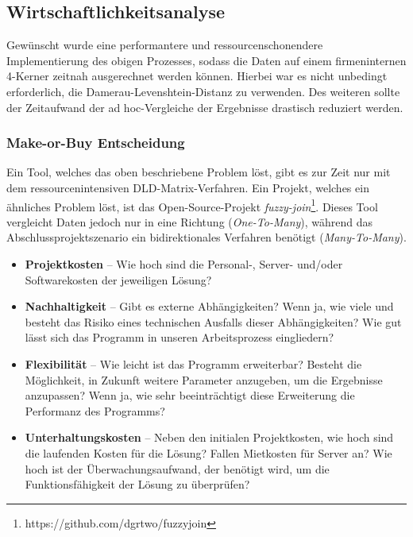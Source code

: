 \subsection{Wirtschaftlichkeitsanalyse}
Gewünscht wurde eine performantere und ressourcenschonendere Implementierung des obigen Prozesses,
sodass die Daten auf einem firmeninternen 4-Kerner zeitnah ausgerechnet werden können.
Hierbei war es nicht unbedingt erforderlich, die Damerau-Levenshtein-Distanz zu verwenden.
Des weiteren sollte der Zeitaufwand der ad hoc-Vergleiche der Ergebnisse drastisch reduziert werden.\par

\subsubsection{Make-or-Buy Entscheidung}
Ein Tool, welches das oben beschriebene Problem löst, gibt es zur Zeit nur mit dem
ressourcenintensiven DLD-Matrix-Verfahren. Ein Projekt, welches ein ähnliches
Problem löst, ist das Open-Source-Projekt \textit{fuzzy-join}\footnote{https://github.com/dgrtwo/fuzzyjoin}.
Dieses Tool vergleicht Daten jedoch nur in eine Richtung (\textit{One-To-Many}),
während das Abschlussprojektszenario ein bidirektionales Verfahren benötigt (\textit{Many-To-Many}).\par


\begin{itemize}
    \item \textbf{Projektkosten} -- Wie hoch sind die Personal-, Server- und/oder Softwarekosten der jeweiligen Lösung?

    \item \textbf{Nachhaltigkeit} -- Gibt es externe Abhängigkeiten? Wenn ja, wie viele und besteht das Risiko eines technischen Ausfalls dieser Abhängigkeiten? Wie gut lässt sich das Programm in unseren Arbeitsprozess eingliedern?

    \item \textbf{Flexibilität} -- Wie leicht ist das Programm erweiterbar? Besteht die Möglichkeit, in Zukunft weitere Parameter anzugeben, um die Ergebnisse anzupassen? Wenn ja, wie sehr beeinträchtigt diese Erweiterung die Performanz des Programms?

    \item \textbf{Unterhaltungskosten} -- Neben den initialen Projektkosten, wie hoch sind die laufenden Kosten für die Lösung? Fallen Mietkosten für Server an? Wie hoch ist der Überwachungsaufwand, der benötigt wird, um die Funktionsfähigkeit der Lösung zu überprüfen?

\end{itemize}



